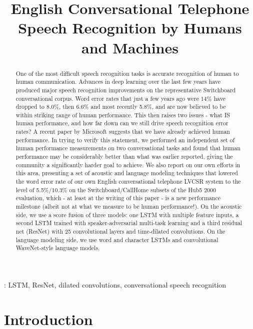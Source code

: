\documentclass[a4paper]{article}
\title{English Conversational Telephone Speech Recognition by Humans and Machines}
\begin{document}
\maketitle

\begin{abstract} 

  One of the most difficult speech recognition tasks is accurate
  recognition of human to human communication. Advances in deep
  learning over the last few years have produced major speech
  recognition improvements on the representative Switchboard
  conversational corpus. Word error rates that just a few years ago
  were 14\% have dropped to 8.0\%, then 6.6\% and most recently
  5.8\%, and are now believed to be within striking range of human
  performance. This then raises two issues - what IS human
  performance, and how far down can we still drive speech recognition
  error rates? A recent paper by Microsoft suggests that we have
  already achieved human performance.  In trying to verify this
  statement, we performed an independent set of human performance
  measurements on two conversational tasks and found that human
  performance may be considerably better than what was earlier
  reported, giving the community a significantly harder goal to
  achieve. We also report on our own efforts in this area, presenting
  a set of acoustic and language modeling techniques that lowered the
  word error rate of our own English conversational telephone LVCSR
  system to the level of 5.5\%/10.3\% on the Switchboard/CallHome
  subsets of the Hub5 2000 evaluation, which - at least at the writing
  of this paper - is a new performance milestone (albeit not at what
  we measure to be human performance!). On the acoustic side, we use a
  score fusion of three models: one LSTM with multiple feature
  inputs, a second LSTM trained with speaker-adversarial multi-task
  learning and a third residual net (ResNet) with 25 convolutional layers
  and time-dilated convolutions.
  On the language modeling side, we use word and character LSTMs and
  convolutional WaveNet-style language models.

\end{abstract}

: LSTM, ResNet, dilated convolutions, conversational speech recognition

\section{Introduction}
\end{document}
